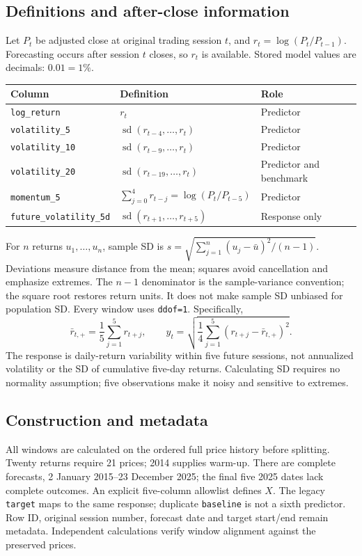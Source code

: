 \documentclass[10pt,letterpaper]{article}
\newcommand{\code}[1]{\texttt{\small #1}}\newcommand{\sd}{\operatorname{sd}}
\begin{document}
\subsection{Definitions and after-close information}
Let $P_t$ be adjusted close at original trading session $t$, and
$r_t=\log(P_t/P_{t-1})$. Forecasting occurs after session $t$ closes, so $r_t$ is
available. Stored model values are decimals: $0.01=1\%$.
\par\noindent
\begin{tabularx}{\linewidth}{@{}L{1.7in}L{2.5in}X@{}}\toprule
Column & Definition & Role\\\midrule
\code{log\_return} & $r_t$ & Predictor\\
\code{volatility\_5} & $\sd(r_{t-4},\ldots,r_t)$ & Predictor\\
\code{volatility\_10} & $\sd(r_{t-9},\ldots,r_t)$ & Predictor\\
\code{volatility\_20} & $\sd(r_{t-19},\ldots,r_t)$ & Predictor and benchmark\\
\code{momentum\_5} & $\sum_{j=0}^{4}r_{t-j}=\log(P_t/P_{t-5})$ & Predictor\\
\code{future\_volatility\_5d} & $\sd(r_{t+1},\ldots,r_{t+5})$ & Response only\\\bottomrule
\end{tabularx}
\par

For $n$ returns $u_1,\ldots,u_n$, sample SD is
$s=\sqrt{\sum_{j=1}^n(u_j-\bar u)^2/(n-1)}$. Deviations measure distance from
the mean; squares avoid cancellation and emphasize extremes. The $n-1$
denominator is the sample-variance convention; the square root restores return
units. It does not make sample SD unbiased for population SD. Every window uses
\code{ddof=1}. Specifically,
\[
\bar r_{t,+}=\frac15\sum_{j=1}^5r_{t+j},\qquad
 y_t=\sqrt{\frac14\sum_{j=1}^5(r_{t+j}-\bar r_{t,+})^2}.
\]
The response is daily-return variability within five future sessions, not
annualized volatility or the SD of cumulative five-day returns. Calculating SD
requires no normality assumption; five observations make it noisy and sensitive
to extremes.

\subsection{Construction and metadata}
All windows are calculated on the ordered full price history before splitting.
Twenty returns require 21 prices; 2014 supplies warm-up. There are
\EligibleCount{} complete forecasts, 2 January 2015--23 December 2025; the final
five 2025 dates lack complete outcomes. An explicit five-column allowlist defines
$X$. The legacy \code{target} maps to the same response; duplicate
\code{baseline} is not a sixth predictor. Row ID, original session number,
forecast date and target start/end remain metadata. Independent calculations
verify window alignment against the preserved prices.
\end{document}
